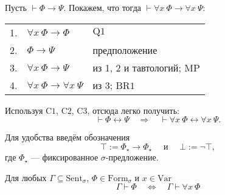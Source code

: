 \documentclass[12pt,a4paper]{article}
\newcommand{\Formul}{\ensuremath{\mathrm{Form}}\xspace}
\newcommand{\Var}{\ensuremath{\mathrm{Var}}\xspace}
\newcommand{\Sent}{\ensuremath{\mathrm{Sent}}\xspace}
\begin{document}
    \begin{example}
        Пусть $\vdash \Phi \rightarrow \Psi$. Покажем, что тогда $\vdash \forall x\ \Phi \rightarrow \forall x\ \Psi$:
        \begin{center}
            \begin{tabular}{rll}
                1.& $\forall x\ \Phi \rightarrow \Phi$& $\mathrm{Q1}$\\
                2.& $\Phi \rightarrow \Psi$& предположение\\
                3.& $\forall x\ \Phi \rightarrow \Psi$& из 1, 2 и тавтологий; $\mathrm{MP}$\\
                4.& $\forall x\ \Phi \rightarrow \forall x\ \Psi$& из 3; $\mathrm{BR1}$
            \end{tabular}
        \end{center}
        Используя $\mathrm{C1}$, $\mathrm{C2}$, $\mathrm{C3}$, отсюда легко получить:
        \[
            \vdash \Phi \leftrightarrow \Psi
            \quad \Longrightarrow \quad
            \vdash \forall x\ \Phi \leftrightarrow \forall x\ \Psi.
        \]
    \end{example}

    \begin{definition}
        Для удобства введём обозначения
        \[
            \top := \Phi_\star \rightarrow \Phi_\star
            \quad \text{ и } \quad
            \bot := \neg \top,
        \]
        где $\Phi_\star$ --- фиксированное $\sigma$-предложение.
    \end{definition}

    \begin{theorem}
        Для любых $\Gamma \subseteq \Sent_\sigma$, $\Phi \in \Formul_\sigma$ и $x \in \Var$
        \[
            \Gamma \vdash \Phi
            \quad \Longleftrightarrow \quad
            \Gamma \vdash \forall x\ \Phi
        \]
    \end{theorem}
\end{document}

